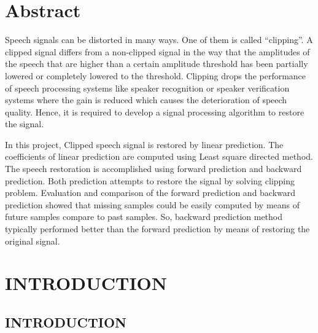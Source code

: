 \documentclass[a4paper,12pt]{report} %
\makeatletter
\newcommand\mainmatter{%
    \cleardoublepage
  \pagenumbering{arabic}}
\makeatother
\begin{document}
\chapter*{Abstract}
Speech signals can be distorted in many ways. One of them is called “clipping”. A clipped signal differs from a non-clipped signal in the way that the amplitudes of the speech that are higher than a certain amplitude threshold has been partially lowered or completely lowered to the threshold. Clipping drops the performance of speech processing systems like speaker recognition or speaker verification systems where the gain is reduced which causes the deterioration of speech quality. Hence, it is required to develop a signal processing algorithm to restore the signal. \par
In this project, Clipped speech signal is restored by linear prediction. The coefficients of linear prediction are computed using Least square directed method. The speech restoration is accomplished using forward prediction and backward prediction. Both prediction attempts to restore the signal by solving clipping problem. Evaluation and comparison of the forward prediction and backward prediction showed that missing samples could be easily computed by means of future samples compare to past samples. So, backward prediction method typically performed better than the forward prediction by means of restoring the original signal.

\setcounter{secnumdepth}{4}
\mainmatter

{}
\chapter{INTRODUCTION}
\section{INTRODUCTION}
\end{document}
